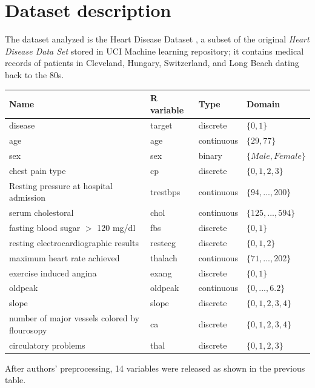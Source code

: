 \documentclass{article}
\begin{document}
\section{Dataset description}
The dataset analyzed is the Heart Disease Dataset \cite{dataset}, a subset of the original \textit{Heart Disease Data Set} stored in UCI Machine learning repository; it contains medical records of patients in Cleveland, Hungary, Switzerland, and Long Beach dating back to the 80s. \\

\begin{center}
\begin{tabularx}{1\textwidth} { 
  | >{\raggedright\arraybackslash}X 
  | >{\centering\arraybackslash}X 
  | >{\centering\arraybackslash}X 
  | >{\raggedleft\arraybackslash}X | }
 \hline
 Name & R variable & Type  & Domain \\
 \hline
 disease  & target  & discrete  & $\{0,1\}$\\
\hline
 age  & age  & continuous  & $\{29,77\}$\\
\hline
 sex  & sex  & binary  & $\{Male,Female\}$\\
\hline
 chest pain type  & cp  & discrete  & $\{0,1,2,3\}$\\
 \hline
 Resting pressure at hospital admission  & trestbps  & continuous  & $\{94,...,200\}$\\
\hline
serum cholestoral  & chol  & continuous  & $ \{125,...,594 \}$\\
\hline
fasting blood sugar $>$ 120 mg/dl  & fbs  & discrete  & $\{0,1\}$\\
\hline
resting electrocardiographic results & restecg  & discrete  & $ \{0,1,2\}$  \\
\hline
maximum heart rate achieved & thalach & continuous  & $ \{71,...,202\}$  \\
\hline
 exercise induced angina & exang & discrete  & $\{0,1\}$  \\
\hline
oldpeak & oldpeak & continuous  & $\{0,...,6.2\}$  \\
\hline
slope & slope & discrete  & $\{0,1,2,3,4\}$  \\
\hline
number of major vessels colored by flourosopy & ca & discrete  & $\{0,1,2,3,4\}$  \\
\hline
circulatory problems & thal & discrete  & $\{0,1,2,3\}$  \\
\hline
\end{tabularx}
\end{center}
After authors' preprocessing, 14 variables were released as shown in the previous table. \\
\end{document}

